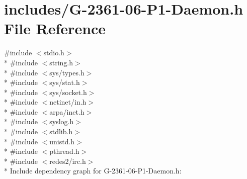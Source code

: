 \hypertarget{_g-2361-06-_p1-_daemon_8h}{}\section{includes/\+G-\/2361-\/06-\/\+P1-\/\+Daemon.h File Reference}
\label{_g-2361-06-_p1-_daemon_8h}
{\ttfamily \#include $<$stdio.\+h$>$}\\*
{\ttfamily \#include $<$string.\+h$>$}\\*
{\ttfamily \#include $<$sys/types.\+h$>$}\\*
{\ttfamily \#include $<$sys/stat.\+h$>$}\\*
{\ttfamily \#include $<$sys/socket.\+h$>$}\\*
{\ttfamily \#include $<$netinet/in.\+h$>$}\\*
{\ttfamily \#include $<$arpa/inet.\+h$>$}\\*
{\ttfamily \#include $<$syslog.\+h$>$}\\*
{\ttfamily \#include $<$stdlib.\+h$>$}\\*
{\ttfamily \#include $<$unistd.\+h$>$}\\*
{\ttfamily \#include $<$pthread.\+h$>$}\\*
{\ttfamily \#include $<$redes2/irc.\+h$>$}\\*
Include dependency graph for G-\/2361-\/06-\/\+P1-\/\+Daemon.h\+:
